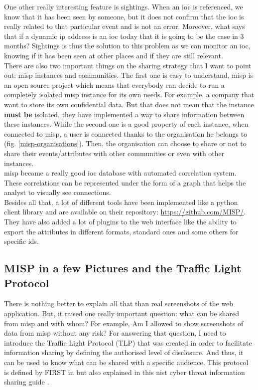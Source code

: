 \documentclass{eplmastersthesis}
\begin{document}
One other really interesting feature is sightings. When an \gls{ioc} is referenced, we know that it has been seen by someone, but it does not confirm that the \gls{ioc} is really related to that particular event and is not an error. Moreover, what says that if a dynamic \gls{ip} address is an \gls{ioc} today that it is going to be the case in 3 months? 
Sightings is thus the solution to this problem as we can monitor an \gls{ioc}, knowing if it has been seen at other places and if they are still relevant.\\


There are also two important things on the sharing strategy that I want to point out: \gls{misp} instances and communities. The first one is easy to understand, \gls{misp} is an open source project which means that everybody can decide to run a completely isolated \gls{misp} instance for its own needs. For example, a company that want to store its own confidential data. But that does not mean that the instance \textbf{must be} isolated, they have implemented a way to share information between these instances. While the second one is a good property of each instance, when connected to \gls{misp}, a user is connected thanks to the organisation he belongs to (fig. \ref{misp-organisations}). Then, the organisation can choose to share or not to share their events/attributes with other communities or even with other instances. \\ 


\gls{misp} became a really good \gls{ioc} database with automated correlation system. These correlations can be represented under the form of a graph that helps the analyst to visually see connections.\\

Besides all that, a lot of different tools have been implemented like a python client library and are available on their repository: \url{https://github.com/MISP/}.
They have also added a lot of plugins to the web interface like the ability to export the attributes in different formats, standard ones and some others for specific \gls{ids}.\\


\subsection{MISP in a few Pictures and the Traffic Light Protocol}
There is nothing better to explain all that than real screenshots of the web application. But, it raised one really important question: what can be shared from \gls{misp} and with whom?
For example, Am I allowed to show screenshots of data from \gls{misp} without any risk?
For answering that question, I need to introduce the Traffic Light Protocol (TLP) that was created in order to facilitate information sharing by defining the authorised level of disclosure. And thus, it can be used to know what can be shared with a specific audience.
This protocol is defined by FIRST in \cite{FirstTLP} but also explained in this \gls{nist} cyber threat information sharing guide \cite{johnson2016guide}.\\
\end{document}
